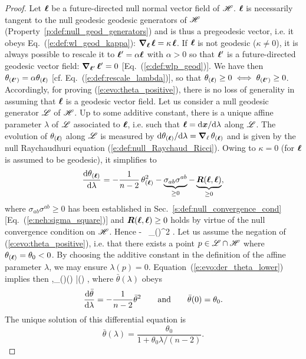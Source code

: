 \begin{proof}
Let $\bm{\ell}$ be a future-directed null normal vector field of $\mathscr{H}$.
$\bm{\ell}$ is necessarily tangent to the null geodesic geodesic generators of $\mathscr{H}$
(Property~\ref{p:def:null_geod_generators}) and is thus a pregeodesic
vector, i.e. it obeys Eq.~(\ref{e:def:wl_geod_kappa}):
$\bm{\nabla}_{\bm{\ell}}\, \bm{\ell} = \kappa \, \bm{\ell} $.
If $\bm{\ell}$ is not geodesic ($\kappa\neq 0$), it is always possible to rescale it
to $\bm{\ell}' = \alpha \bm{\ell}$ with $\alpha > 0$ so that $\bm{\ell}'$ is a future-directed geodesic vector field:
$\bm{\nabla}_{\bm{\ell}'}\, \bm{\ell}' = 0$ [Eq.~(\ref{e:def:wlp_geod})].
We have then $\theta_{(\bm{\ell}')} = \alpha \theta_{(\bm{\ell})}$ [cf. Eq.~(\ref{e:def:rescale_lambda})],
so that $\theta_{(\bm{\ell})} \geq 0 \iff \theta_{(\bm{\ell}')} \geq 0$.
Accordingly, for proving (\ref{e:evo:theta_positive}), there is no loss of generality in assuming that
$\bm{\ell}$ is a geodesic vector field.
Let us consider a null geodesic generator $\mathscr{L}$ of $\mathscr{H}$. Up to some additive constant, there is
a unique affine parameter $\lambda$ of $\mathscr{L}$ associated to $\bm{\ell}$, i.e.  such that
$\bm{\ell} = \mathrm{d}\bm{x}/\mathrm{d}\lambda$ along $\mathscr{L}$. The evolution of
$\theta_{(\bm{\ell})}$ along $\mathscr{L}$
is measured by $\mathrm{d}\theta_{(\bm{\ell})}/\mathrm{d}\lambda = \bm{\nabla}_{\ell}\,  \theta_{(\bm{\ell})}$ and is given by
the null Raychaudhuri equation (\ref{e:def:null_Raychaud_Ricci}).
Owing to $\kappa=0$ (for $\bm{\ell}$ is assumed to be geodesic), it simplifies to
\[
    \frac{\mathrm{d} \theta_{(\bm{\ell})}}{\mathrm{d} \lambda}  =
        - \frac{1}{n-2} \, \theta_{(\bm{\ell})}^2
        - \underbrace{\sigma_{ab} \sigma^{ab}}_{\geq 0}
        - \underbrace{\bm{R}(\bm{\ell}, \bm{\ell})}_{\geq 0} ,
\]
where $\sigma_{ab} \sigma^{ab} \geq 0$ has been established in
Sec.~\ref{s:def:null_convergence_cond} [Eq.~(\ref{e:neh:sigma_square})]
and $\bm{R}(\bm{\ell}, \bm{\ell}) \geq 0$ holds by virtue of the null
convergence condition on $\mathscr{H}$. Hence
\be \label{e:evo:der_theta_lower}
    \derd{\theta_{(\wl)}}{\lambda}  \leq
        -  \, \theta_{(\wl)}^2  .
\ee
Let us assume the negation of (\ref{e:evo:theta_positive}), i.e. that there
exists a point $p\in\mathscr{L}\cap\mathscr{H}$ where $\theta_{(\bm{\ell})} = \theta_0 < 0$.
By choosing the additive constant in the definition of the affine parameter $\lambda$,
we may ensure $\lambda(p) = 0$.
Equation~(\ref{e:evo:der_theta_lower}) implies then
\be \label{e:evo:theta_lower_theta_bar}
 \forall \lambda{},\quad \theta_{(\wl)}(\lambda) \leq \bar\theta(\lambda) ,
\ee
where $\bar\theta(\lambda)$ obeys
\[
    \frac{\mathrm{d}\bar\theta}{\mathrm{d}\lambda} = -  \frac{1}{n-2}  \bar\theta^2
    \qquad\mbox{and}\qquad \bar\theta(0) = \theta_0 .
\]
The unique solution of this differential equation is
\[
\bar\theta(\lambda) = \frac{\theta_0}{1 + \theta_0\lambda/(n-2)} .
\]
\end{proof}
